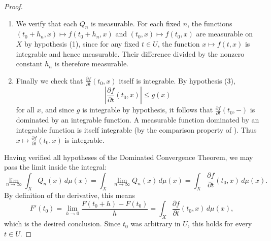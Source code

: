 \begin{proof}
\begin{enumerate}
    \item We verify that each $Q_n$ is measurable. For each fixed $n$, the functions $(t_0 + h_n, x) \mapsto f(t_0 + h_n, x)$ and $(t_0, x) \mapsto f(t_0, x)$ are measurable on $X$ by hypothesis (1), since for any fixed $t \in U$, the function $x \mapsto f(t,x)$ is integrable and hence measurable. Their difference divided by the nonzero constant $h_n$ is therefore measurable.

    \item Finally we check that $\frac{\partial f}{\partial t}(t_0, x)$ itself is integrable. By hypothesis (3), $$\left|\frac{\partial f}{\partial t}(t_0, x)\right| \leq g(x)$$ for all $x$, and since $g$ is integrable by hypothesis, it follows that $\frac{\partial f}{\partial t}(t_0, -)$ is dominated by an integrable function. A measurable function dominated by an integrable function is itself integrable (by the comparison property of ). Thus $x \mapsto \frac{\partial f}{\partial t}(t_0, x)$ is integrable.
\end{enumerate}

Having verified all hypotheses of the Dominated Convergence Theorem, we may pass the limit inside the integral: $$\lim_{n \to \infty} \int_X Q_n(x) \, d\mu(x) = \int_X \lim_{n \to \infty} Q_n(x) \, d\mu(x) = \int_X \frac{\partial f}{\partial t}(t_0, x) \, d\mu(x).$$ By definition of the derivative, this means $$F'(t_0) = \lim_{h \to 0} \frac{F(t_0 + h) - F(t_0)}{h} = \int_X \frac{\partial f}{\partial t}(t_0, x) \, d\mu(x),$$ which is the desired conclusion. Since $t_0$ was arbitrary in $U$, this holds for every $t \in U$.
\end{proof}
